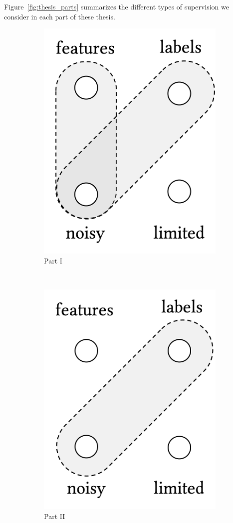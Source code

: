 Figure~\ref{fig:thesis_parts} summarizes the different types of supervision we consider in each part of these thesis.
\begin{figure}[t]
    \centering
    \begin{subfigure}[b]{0.32\textwidth}
    \centering
        \includegraphics[width=0.55\linewidth]{01-introduction/figs_and_tables/fig_p1.png}
        \caption{\label{fig:p1}Part I}
    \end{subfigure}
        ~ 
    \begin{subfigure}[b]{0.32\textwidth}
    \centering
        \includegraphics[width=0.55\linewidth]{01-introduction/figs_and_tables/fig_p2.png}
        \caption{\label{fig:p2}Part II}
    \end{subfigure}
        ~ 
    \begin{subfigure}[b]{0.32\textwidth}

\end{subfigure}
\end{figure}
